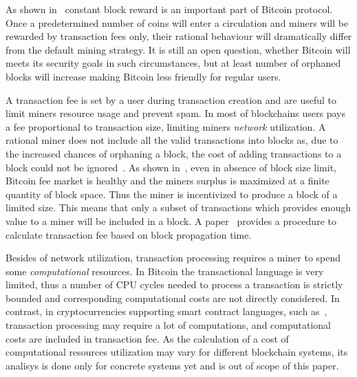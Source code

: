 \documentclass[]{llncs}   %
\begin{document}
As shown in~\cite{carlsten2016instability} constant block reward is an important
part of Bitcoin protocol. Once a predetermined number of coins will enter a circulation
and miners will be rewarded by transaction fees only, their rational behaviour will
dramatically differ from the default mining strategy. It is still an open question, whether
Bitcoin will meets its security goals in such circumstances, but at least number of
orphaned blocks will increase making Bitcoin less friendly for regular users.

A transaction fee is set by a user during transaction creation and are
useful to limit miners resource usage and prevent spam. In most of
blockchains users pays a fee proportional to transaction size,
limiting miners {\em network} utilization. A rational miner does not
include all the valid transactions into blocks as, due to the increased
chances of orphaning a block, the cost of adding transactions to a block
could not be ignored~\cite{andersen2013,rizun2015transaction}. As shown
in~\cite{rizun2015transaction}, even in absence of block size limit,
Bitcoin fee market is healthy and the miners surplus is maximized at a
finite quantity of block space. Thus the miner is incentivized to produce
a block of a limited size. This means that only a subset of transactions
which provides enough value to a miner will be included in a block. A
paper~\cite{rizun2015transaction} provides a procedure to calculate
transaction fee based on block propagation time.

Besides of network utilization, transaction processing requires a miner
to spend some {\em computational} resources.
In Bitcoin the transactional language\cite{script} is very limited, thus
a number of CPU cycles needed to process a transaction
is strictly bounded and corresponding computational costs are not directly
considered. In contrast, in cryptocurrencies supporting smart contract
languages, such as~\cite{seijas2016scripting,tezosScript,solidity},
transaction processing may require a lot of computations, and
computational costs are included in transaction fee. As the calculation
of a cost of computational resources utilization may vary for different
blockchain systems, its analisys is done only for concrete systems yet
\cite{Earlz2017,luu2015demystifying} and is out of scope of this paper.
\end{document}
